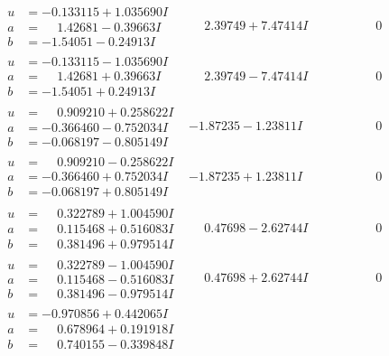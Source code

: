 \documentclass[1p]{elsarticle_modified}
\theoremstyle{definition}
\begin{document}
$$\begin{array}{c|c|c}
\begin{aligned}
u &= -0.133115 + 1.035690 I \\
a &= \phantom{-}1.42681 - 0.39663 I \\
b &= -1.54051 - 0.24913 I\end{aligned}
 & \phantom{-}2.39749 + 7.47414 I & \phantom{-0.000000 } 0 \\ \hline\begin{aligned}
u &= -0.133115 - 1.035690 I \\
a &= \phantom{-}1.42681 + 0.39663 I \\
b &= -1.54051 + 0.24913 I\end{aligned}
 & \phantom{-}2.39749 - 7.47414 I & \phantom{-0.000000 } 0 \\ \hline\begin{aligned}
u &= \phantom{-}0.909210 + 0.258622 I \\
a &= -0.366460 - 0.752034 I \\
b &= -0.068197 - 0.805149 I\end{aligned}
 & -1.87235 - 1.23811 I & \phantom{-0.000000 } 0 \\ \hline\begin{aligned}
u &= \phantom{-}0.909210 - 0.258622 I \\
a &= -0.366460 + 0.752034 I \\
b &= -0.068197 + 0.805149 I\end{aligned}
 & -1.87235 + 1.23811 I & \phantom{-0.000000 } 0 \\ \hline\begin{aligned}
u &= \phantom{-}0.322789 + 1.004590 I \\
a &= \phantom{-}0.115468 + 0.516083 I \\
b &= \phantom{-}0.381496 + 0.979514 I\end{aligned}
 & \phantom{-}0.47698 - 2.62744 I & \phantom{-0.000000 } 0 \\ \hline\begin{aligned}
u &= \phantom{-}0.322789 - 1.004590 I \\
a &= \phantom{-}0.115468 - 0.516083 I \\
b &= \phantom{-}0.381496 - 0.979514 I\end{aligned}
 & \phantom{-}0.47698 + 2.62744 I & \phantom{-0.000000 } 0 \\ \hline\begin{aligned}
u &= -0.970856 + 0.442065 I \\
a &= \phantom{-}0.678964 + 0.191918 I \\
b &= \phantom{-}0.740155 - 0.339848 I\end{aligned}

\end{array}$$
\end{document}
